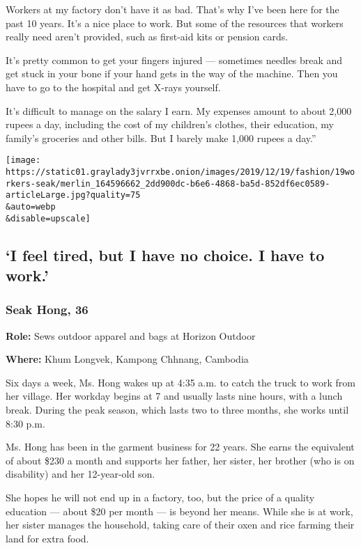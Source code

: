 Workers at my factory don't have it as bad. That's why I've been here
for the past 10 years. It's a nice place to work. But some of the
resources that workers really need aren't provided, such as first-aid
kits or pension cards.

It's pretty common to get your fingers injured --- sometimes needles
break and get stuck in your bone if your hand gets in the way of the
machine. Then you have to go to the hospital and get X-rays yourself.

It's difficult to manage on the salary I earn. My expenses amount to
about 2,000 rupees a day, including the cost of my children's clothes,
their education, my family's groceries and other bills. But I barely
make 1,000 rupees a day.''

\texttt{[image: https://static01.graylady3jvrrxbe.onion/images/2019/12/19/fashion/19workers-seak/merlin\_164596662\_2dd900dc-b6e6-4868-ba5d-852df6ec0589-articleLarge.jpg?quality=75\\\&auto=webp\\\&disable=upscale]}

\hypertarget{i-feel-tired-but-i-have-no-choice-i-have-to-work}{%
\subsection{`I feel tired, but I have no choice. I have to
work.'}\label{i-feel-tired-but-i-have-no-choice-i-have-to-work}}

\hypertarget{seak-hong-36}{%
\subsubsection{Seak Hong, 36}\label{seak-hong-36}}

\textbf{Role:} Sews outdoor apparel and bags at Horizon Outdoor

\textbf{Where:} Khum Longvek, Kampong Chhnang, Cambodia

Six days a week, Ms. Hong wakes up at 4:35 a.m. to catch the truck to
work from her village. Her workday begins at 7 and usually lasts nine
hours, with a lunch break. During the peak season, which lasts two to
three months, she works until 8:30 p.m.

Ms. Hong has been in the garment business for 22 years. She earns the
equivalent of about \$230 a month and supports her father, her sister,
her brother (who is on disability) and her 12-year-old son.

She hopes he will not end up in a factory, too, but the price of a
quality education --- about \$20 per month --- is beyond her means.
While she is at work, her sister manages the household, taking care of
their oxen and rice farming their land for extra food.

